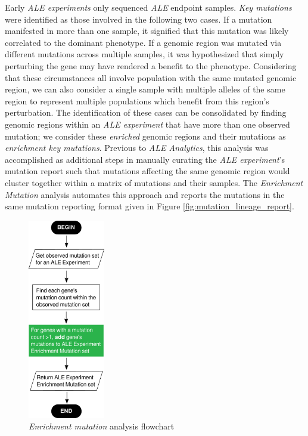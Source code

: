 \documentclass[12pt,final,masters,chapterheads]{ucsd}  %
\begin{document}
Early \textit{ALE experiments} only sequenced \textit{ALE} endpoint samples. \textit{Key mutations} were identified as those involved in the following two cases. If a mutation manifested in more than one sample, it signified that this mutation was likely correlated to the dominant phenotype. If a genomic region was mutated via different mutations across multiple samples, it was hypothesized that simply perturbing the gene may have rendered a benefit to the phenotype. Considering that these circumstances all involve population with the same mutated genomic region, we can also consider a single sample with multiple alleles of the same region to represent multiple populations which benefit from this region's perturbation. The identification of these cases can be consolidated by finding genomic regions within an \textit{ALE experiment} that have more than one observed mutation; we consider these \textit{enriched} genomic regions and their mutations as \textit{enrichment key mutations}. Previous to \textit{ALE Analytics}, this analysis was accomplished as additional steps in manually curating the \textit{ALE experiment}'s mutation report such that mutations affecting the same genomic region would cluster together within a matrix of mutations and their samples. The \textit{Enrichment Mutation} analysis automates this approach and reports the mutations in the same mutation reporting format given in Figure \ref{fig:mutation_lineage_report}.

\begin{figure}[H]
  \caption{\textit{Enrichment mutation} analysis flowchart}
  \centering
  \includegraphics[width=0.3\textwidth]{enrichment_mutation_flowchart.png}
\end{figure}
\end{document}
